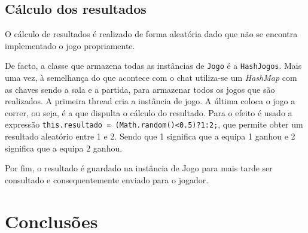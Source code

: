 \documentclass[a4paper]{article}
\begin{document}

\subsection{Cálculo dos resultados}
\label{sec:3.5}
\hspace{3mm} O cálculo de resultados é realizado de forma aleatória dado que não se encontra implementado o jogo propriamente.

De facto, a classe que armazena todas as instâncias de \texttt{Jogo} é a \texttt{HashJogos}. Mais uma vez, à semelhança do que acontece com o chat utiliza-se um \textit{HashMap} com as chaves sendo a sala e a partida, para armazenar todos os jogos que são realizados. A primeira thread cria a instância de jogo. A última coloca o jogo a correr, ou seja, é a que dispulta o cálculo do resultado. Para o efeito é usado a expressão \texttt{this.resultado = (Math.random()<0.5)?1:2;}, que permite obter um resultado aleatório entre 1 e 2. Sendo que 1 significa que a equipa 1 ganhou e 2 significa que a equipa 2 ganhou. 

Por fim, o resultado é guardado na instância de Jogo para mais tarde ser consultado e consequentemente enviado para o jogador.

\pagebreak


\section{Conclusões}
\label{sec:4}

\hspace{3mm} 
\end{document}
